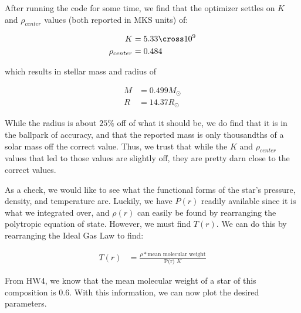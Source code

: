 \documentclass[12pt]{article}
\begin{document}
After running the code for some time, we find that the optimizer settles on $K$ and $\rho_{center}$ values (both reported in MKS units) of:

\begin{align}
  K &= 5.33 \cross 10^{9} \\
  \rho_{center} &= 0.484
\end{align}

which results in stellar mass and radius of

\begin{align}
  M &= 0.499 M_{\odot} \\
  R &= 14.37 R_{\odot}
\end{align}


\bigskip
\bigskip


While the radius is about $25\%$ off of what it should be, we do find that it is in the ballpark of accuracy, and that the reported mass is only thousandths of a solar mass off the correct value. Thus, we trust that while the $K$ and $\rho_{center}$ values that led to those values are slightly off, they are pretty darn close to the correct values.

\bigskip
\bigskip

As a check, we would like to see what the functional forms of the star's pressure, density, and temperature are. Luckily, we have $P(r)$ readily available since it is what we integrated over, and $\rho(r)$ can easily be found by rearranging the polytropic equation of state. However, we must find $T(r)$. We can do this by rearranging the Ideal Gas Law to find:

\begin{align}
  T(r) &= \frac{\rho * \text{mean molecular weight}}{\text{P(r) } K}
\end{align}

From HW4, we know that the mean molecular weight of a star of this composition is 0.6. With this information, we can now plot the desired parameters.

\bigskip
\bigskip

\bigskip
\bigskip
\end{document}
